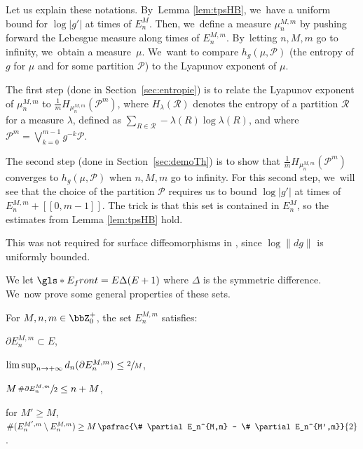 Let us explain these notations. By~Lemma \ref{lem:tpsHB}, we~have a uniform bound for $\log |g'|$ at times of $E_n^M$.
Then, we~define a measure $\mu_n^{M,m}$ by pushing forward the Lebesgue measure along times of $E_n^{M,m}$. By~letting $n,M,m$ go to infinity, we~obtain a measure~$\mu$. We~want to compare $h_g(\mu, \mathcal{P})$ (the entropy of $g$ for $\mu$ and for some partition $\mathcal{P}$) to the Lyapunov exponent of $\mu$.

The first step (done in Section~\ref{sec:entropie}) is to relate the Lyapunov exponent of $\mu_n^{M,m}$ to $\frac{1}{m} H_{\mu_n^{M,m}} (\mathcal{P}^m)$, where $H_{\lambda}(\mathcal{R})$ denotes the entropy of a partition $\mathcal{R}$ for a measure $\lambda$, defined as $\sum_{R \in \mathcal{R}} - \lambda(R) \log \lambda(R)$, and where $\mathcal{P}^m = \bigvee_{k=0}^{m-1} g^{-k} \mathcal{P}$.

The second step (done in Section~\ref{sec:demoTh}) is to show that $\frac{1}{m} H_{\mu_n^{M,m}} (\mathcal{P}^m)$ converges to $h_g(\mu, \mathcal{P})$ when $n,M,m$ go to infinity.
For this second step, we~will see that the choice of the partition $\mathcal{P}$ requires us to bound $\log |g'|$ at times of $E_n^{M,m} + [\![ 0, m-1 ]\!]$.
The trick is that this set is contained in $E_n^M$, so the estimates from Lemma \ref{lem:tpsHB} hold.

This was not required for surface diffeomorphisms in \cite{MR4701884}, since $\log \| d g\|$ is uniformly bounded.

We let $\gls*{E_front} = E \Delta (E+1)$ where $\Delta$ is the symmetric difference. We~now prove some general properties of these sets.

\begin{lem}
\label{lem:EnM}
For $M,n,m \in \bbZ_0^+$, the set $E_n^{M,m}$ satisfies:
\begin{enumeratei}
\item\label{lem:EnMi}
$\partial E_n^{M,m} \subset E$,
\item\label{lem:EnMii}
$\limsup_{n \to + \infty} d_n(\partial E_n^{M,m}) \leq \sfrac{2}{M}$,
\item\label{lem:EnMiii}
$M\, \sfrac{\# \partial E_n^{M,m}}{2} \leq n + M$,
\item\label{lem:EnMiv}
for $M' \geq M$, $\# (E_n^{M',m} \setminus E_n^{M,m})
\geq M\, \psfrac{\# \partial E_n^{M,m} - \# \partial E_n^{M',m}}{2}$.
\end{enumeratei}
\end{lem}

